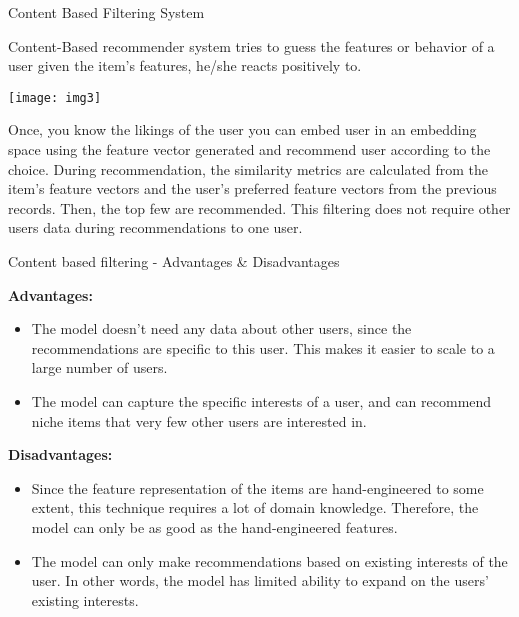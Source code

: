 \documentclass{beamer}
\newcommand\myheading[1]{%
  \par\bigskip
  {\large\bfseries#1}\par\smallskip}
\begin{document}
\begin{frame}{Content Based Filtering System}
\begin{flushleft}
	Content-Based recommender system tries to guess the features or behavior of a user given the item’s features, he/she reacts positively to.
\end{flushleft}
	\texttt{[image: img3]}	
	\begin{flushleft}
		Once, you know the likings of the user you can embed user in an embedding space using the feature vector generated and recommend user according to the choice. During recommendation, the similarity metrics are calculated from the item’s feature vectors and the user’s preferred feature vectors from the previous records. Then, the top few are recommended.
This filtering does not require other users data during recommendations to one user.
	\end{flushleft}
\end{frame}

\begin{frame}{Content based filtering - Advantages \& Disadvantages}
	\begin{flushleft}
		\myheading{Advantages:}
		\begin{itemize}
			\item The model doesn't need any data about other users, since the recommendations are specific to this user. This makes it easier to scale to a large number of users.
			\item The model can capture the specific interests of a user, and can recommend niche items that very few other users are interested in.
		\end{itemize}
		\myheading{Disadvantages:}
		\begin{itemize}
			\item Since the feature representation of the items are hand-engineered to some extent, this technique requires a lot of domain knowledge. Therefore, the model can only be as good as the hand-engineered features.
			\item The model can only make recommendations based on existing interests of the user. In other words, the model has limited ability to expand on the users' existing interests.
		\end{itemize}
	\end{flushleft}
\end{frame}
\end{document}
